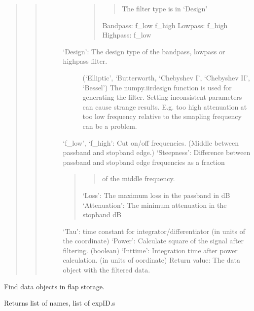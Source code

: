 \documentclass[letterpaper,10pt,english]{sphinxmanual}
\begin{document}
\begin{fulllineitems}
\begin{quote}
\begin{quote}
\begin{description}
\begin{description}
\begin{quote}
\begin{quote}
The filter type is in ‘Design’
\end{quote}

Bandpass: f\_low \sphinxhyphen{} f\_high
Lowpass: \sphinxhyphen{} f\_high
Highpass: \sphinxhyphen{} f\_low
\end{quote}

\item[{‘Design’: The design type of the bandpass, lowpass or highpass filter.}] \leavevmode
(‘Elliptic’, ‘Butterworth, ‘Chebyshev I’, ‘Chebyshev II’, ‘Bessel’)
The numpy.iirdesign function is used for generating the filter.
Setting inconsistent parameters can cause strange results. E.g. too high attenuation
at too low frequency relative to the smapling frequency can be a problem.

\end{description}

‘f\_low’, ‘f\_high’: Cut on/off frequencies. (Middle between passband and stopband edge.)
‘Steepness’: Difference between passband and stopband edge frequencies as a fraction
\begin{quote}
\begin{quote}

of the middle frequency.
\end{quote}

‘Loss’: The maximum loss in the passband in dB
‘Attenuation’: The minimum attenuation in the stopband dB
\end{quote}

‘Tau’: time constant for integrator/differentiator (in units of the coordinate)
‘Power’: Calculate square of the signal after filtering. (boolean)
‘Inttime’: Integration time after power calculation. (in units of oordinate)    Return value: The data object with the filtered data.

\end{description}
\end{quote}
\end{quote}

\end{fulllineitems}


\begin{fulllineitems}
\label{\detokenize{data_object:flap.data_object.find_data_objects}}
Find data objects in flap storage.

Returns list of names, list of expID.s

\end{fulllineitems}
\end{document}
